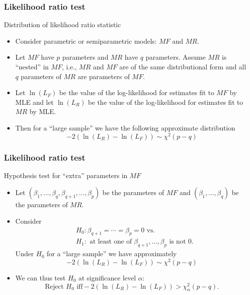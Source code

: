 \documentclass{beamer}
\theoremstyle{definition}
\begin{document}
\begin{frame}
\frametitle{Likelihood ratio test}
\begin{block}{Distribution of likelihood ratio statistic}
\begin{itemize}
\item Consider parametric or semiparametric models: $MF$ and $MR$.
\item Let $MF$ have $p$ parameters and $MR$ have $q$ parameters. Assume $MR$ is ``nested'' in $MF$, i.e., $MR$ and $MF$ are of the same distributional form and all $q$ parameters of $MR$ are parameters of $MF$.
\item Let $\ln(L_F)$ be the value of the log-likelihood for estimates fit to $MF$ by MLE and let $\ln(L_R)$ be the value of the log-likelihood for estimates fit to $MR$ by MLE.
\item Then for a ``large sample'' we have the following approximate distribution
\[
-2(\ln(L_R) - \ln(L_F)) \sim \chi^2(p-q)
\]
\end{itemize}
\end{block}
\end{frame}

\begin{frame}
\frametitle{Likelihood ratio test}
\begin{block}{Hypothesis test for ``extra'' parameters in $MF$}
\begin{itemize}
\item Let $(\beta_1,\ldots,\beta_q,\beta_{q+1},\ldots,\beta_p)$ be the parameters of $MF$ and $(\beta_1,\ldots,\beta_q)$ be the parameters of $MR$.
\item Consider
\vspace{-10pt}
\begin{align*}  & H_0: \beta_{q+1} = \cdots = \beta_p=0 \text{ vs.}  \\
& H_1: \text{ at least one of }  \beta_{q+1}, \ldots, \beta_p \text{ is not 0}.
\end{align*}
Under $H_0$ for a ``large sample'' we have approximately
\[
-2(\ln(L_R) - \ln(L_F)) \sim \chi^2(p-q)
\]
\item We can thus test $H_0$ at significance level $\alpha$:
\[ \text{Reject } H_0 \text{ iff} -2(\ln(L_R) - \ln(L_F)) >\chi^2_\alpha(p-q).
\]
\end{itemize}
\end{block}
\end{frame}
\end{document}
